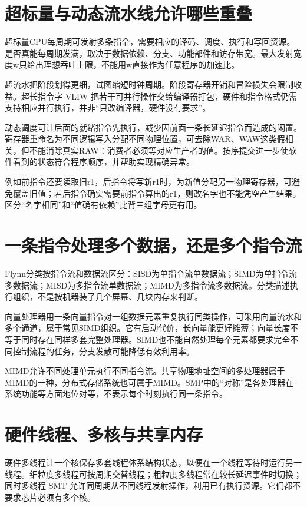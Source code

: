 \section{超标量与动态流水线允许哪些重叠}\label{co-06-04}

超标量CPU每周期可发射多条指令，需要相应的译码、调度、执行和写回资源。是否真能每周期发满，取决于数据依赖、分支、功能部件和访存带宽。最大发射宽度w只给出理想吞吐上限，不能用w直接作为任意程序的加速比。

超流水把阶段划得更细，试图缩短时钟周期。阶段寄存器开销和冒险损失会限制收益。超长指令字 VLIW 把若干可并行操作交给编译器打包，硬件和指令格式仍需支持相应并行执行，并非``只改编译器，硬件没有要求''。

动态调度可让后面的就绪指令先执行，减少因前面一条长延迟指令而造成的闲置。寄存器重命名为不同逻辑写入分配不同物理位置，可去除WAR、WAW这类假相关，但不能消除真实RAW：消费者必须等对应生产者的值。按序提交进一步使软件看到的状态符合程序顺序，并帮助实现精确异常。

例如前指令还要读取旧r1，后指令将写新r1时，为新值分配另一物理寄存器，可避免覆盖旧值；若后指令确实需要前指令算出的r1，则改名字也不能凭空产生结果。区分``名字相同''和``值确有依赖''比背三组字母更有用。

\section{一条指令处理多个数据，还是多个指令流}\label{co-06-05}

Flynn分类按指令流和数据流区分：SISD为单指令流单数据流；SIMD为单指令流多数据流；MISD为多指令流单数据流；MIMD为多指令流多数据流。分类描述执行组织，不是按机器装了几个屏幕、几块内存来判断。

向量处理器用一条向量指令对一组数据元素重复执行同类操作，可采用向量流水和多个通道，属于常见SIMD组织。它有启动代价，长向量能更好摊薄；向量长度不等于同时存在同样多套完整处理器。SIMD也不能自然处理每个元素都要求完全不同控制流程的任务，分支发散可能降低有效利用率。

MIMD允许不同处理单元执行不同指令流。共享物理地址空间的多处理器属于MIMD的一种，分布式存储系统也可属于MIMD。SMP中的``对称''是各处理器在系统功能等方面地位对等，不表示每个时刻执行同一条指令。

\section{硬件线程、多核与共享内存}\label{co-06-06}

硬件多线程让一个核保存多套线程体系结构状态，以便在一个线程等待时运行另一线程。细粒度多线程可按周期交替线程；粗粒度多线程常在较长延迟事件时切换；同时多线程 SMT 允许同周期从不同线程发射操作，利用已有执行资源。它们都不要求芯片必须有多个核。

